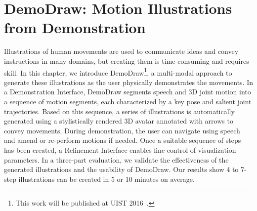 
\chapter{DemoDraw: Motion Illustrations from Demonstration}
\label{chapter_demodraw}

\newcommand{\systemname}{DemoDraw}
\newcommand{\phaseI}{Demonstration Interface}
\newcommand{\phaseII}{Refinement Interface}

Illustrations of human movements are used to communicate ideas and convey instructions in many domains, but creating them is time-consuming and requires skill. In this chapter, we introduce DemoDraw\footnote{This work will be published at UIST 2016~\cite{Chi:2016:DemoDraw}.}, a multi-modal approach to generate these illustrations as the user physically demonstrates the movements. In a Demonstration Interface, DemoDraw segments speech and 3D joint motion into a sequence of motion segments, each characterized by a key pose and salient joint trajectories. Based on this sequence, a series of illustrations is automatically generated using a stylistically rendered 3D avatar annotated with arrows to convey movements. During demonstration, the user can navigate using speech and amend or re-perform motions if needed. Once a suitable sequence of steps has been created, a Refinement Interface enables fine control of visualization parameters. In a three-part evaluation, we validate the effectiveness of the generated illustrations and the usability of DemoDraw. Our results show 4 to 7-step illustrations can be created in 5 or 10 minutes on average.








